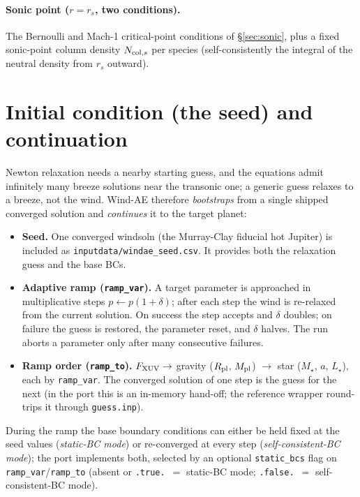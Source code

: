 \documentclass[english,a4paper]{my_memo}
\newcommand{\code}[1]{\texttt{#1}}
\begin{document}
\paragraph{Sonic point ($r=r_s$, two conditions).} The Bernoulli and
Mach-1 critical-point conditions of \S\ref{sec:sonic}, plus a fixed
sonic-point column density $N_{{\rm col},s}$ per species (self-consistently
the integral of the neutral density from $r_s$ outward).

\section{Initial condition (the seed) and continuation}\label{sec:ramp}
Newton relaxation needs a nearby starting guess, and the equations admit
infinitely many breeze solutions near the transonic one; a generic guess
relaxes to a breeze, not the wind. Wind-AE therefore \emph{bootstraps}
from a single shipped converged solution and \emph{continues} it to the
target planet:
\begin{itemize}\itemsep1pt
\item \textbf{Seed.} One converged windsoln (the Murray-Clay fiducial hot
  Jupiter) is included as \code{inputdata/}\allowbreak\code{windae\_seed.csv}. It provides
  both the relaxation guess and the base BCs.
\item \textbf{Adaptive ramp (\code{ramp\_var}).} A target parameter is
  approached in multiplicative steps $p\leftarrow p(1+\delta)$; after each
  step the wind is re-relaxed from the current solution. On success the
  step accepts and $\delta$ doubles; on failure the guess is restored,
  the parameter reset, and $\delta$ halves. The run aborts a parameter
  only after many consecutive failures.
\item \textbf{Ramp order (\code{ramp\_to}).} $F_{\rm XUV}\to$ gravity
  ($R_{\rm pl}$, $M_{\rm pl}$) $\to$ star ($M_\star$, $a$, $L_\star$),
  each by \code{ramp\_var}. The converged solution of one step is the
  guess for the next (in the port this is an in-memory hand-off; the
  reference wrapper round-trips it through \code{guess.inp}).
\end{itemize}
During the ramp the base boundary conditions can either be held fixed at
the seed values (\emph{static-BC mode}) or re-converged at every step
(\emph{self-consistent-BC mode}); the port implements both, selected by an optional
\code{static\_bcs} flag on \code{ramp\_var}/\code{ramp\_to} (absent or
\code{.true.}\ $=$ static-BC mode; \code{.false.}\ $=$ self-consistent-BC mode).
\end{document}
